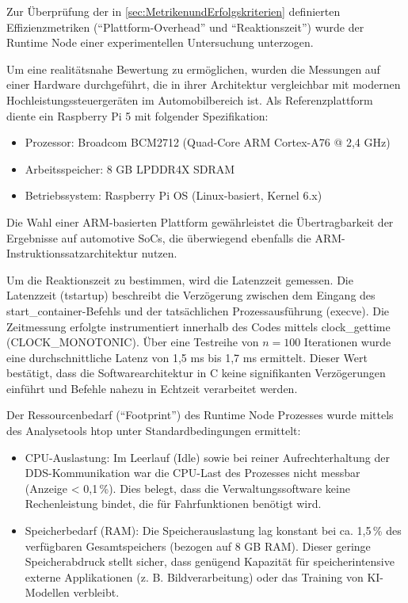 Zur Überprüfung der in \autoref{sec:MetrikenundErfolgskriterien} definierten Effizienzmetriken (\enquote{Plattform-Overhead} und \enquote{Reaktionszeit}) wurde der Runtime Node einer experimentellen Untersuchung unterzogen.

Um eine realitätsnahe Bewertung zu ermöglichen, wurden die Messungen auf einer Hardware durchgeführt, die in ihrer Architektur vergleichbar mit modernen Hochleistungssteuergeräten im Automobilbereich ist. Als Referenzplattform diente ein Raspberry Pi 5 mit folgender Spezifikation:

\begin{itemize}
    \item Prozessor: Broadcom BCM2712 (Quad-Core ARM Cortex-A76 @ 2,4 GHz)
    
    \item Arbeitsspeicher: 8 GB LPDDR4X SDRAM
    
    \item Betriebssystem: Raspberry Pi OS (Linux-basiert, Kernel 6.x)
\end{itemize}

Die Wahl einer ARM-basierten Plattform gewährleistet die Übertragbarkeit der Ergebnisse auf automotive SoCs, die überwiegend ebenfalls die ARM-Instruktionssatzarchitektur nutzen.

Um die Reaktionszeit zu bestimmen, wird die Latenzzeit gemessen. Die Latenzzeit (tstartup​) beschreibt die Verzögerung zwischen dem Eingang des start\_container-Befehls und der tatsächlichen Prozessausführung (execve). Die Zeitmessung erfolgte instrumentiert innerhalb des Codes mittels clock\_gettime (CLOCK\_MONOTONIC). Über eine Testreihe von $n=100$ Iterationen wurde eine durchschnittliche Latenz von 1,5 ms bis 1,7 ms ermittelt. Dieser Wert bestätigt, dass die Softwarearchitektur in C keine signifikanten Verzögerungen einführt und Befehle nahezu in Echtzeit verarbeitet werden.

Der Ressourcenbedarf (\enquote{Footprint}) des Runtime Node Prozesses wurde mittels des Analysetools htop unter Standardbedingungen ermittelt:

\begin{itemize}
    \item CPU-Auslastung: Im Leerlauf (Idle) sowie bei reiner Aufrechterhaltung der DDS-Kommunikation war die CPU-Last des Prozesses nicht messbar (Anzeige < 0,1\,\%). Dies belegt, dass die Verwaltungssoftware keine Rechenleistung bindet, die für Fahrfunktionen benötigt wird.
    
    \item Speicherbedarf (RAM): Die Speicherauslastung lag konstant bei ca. 1,5\,\% des verfügbaren Gesamtspeichers (bezogen auf 8 GB RAM). Dieser geringe Speicherabdruck stellt sicher, dass genügend Kapazität für speicherintensive externe Applikationen (z. B. Bildverarbeitung) oder das Training von KI-Modellen verbleibt.
\end{itemize}

